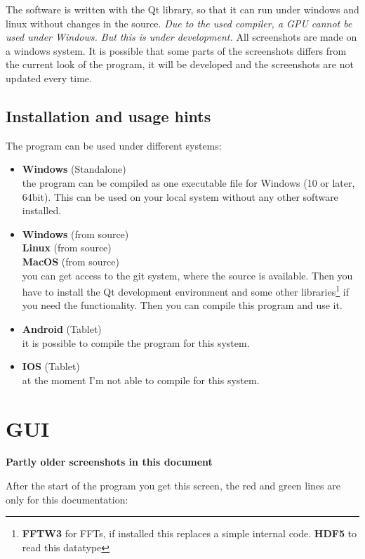 \documentclass[11pt]{article} %
\begin{document}
The software is written with the Qt library, so that it can run under windows and linux without changes in the source. {\it Due to the used compiler, a GPU cannot be used under Windows. But this is under development.} All screenshots are made on a windows system. It is possible that some parts of the screenshots differs from the current look of the program, it will be developed and the screenshots are not updated every time.

\subsection{Installation and usage hints}

The program can be used under different systems:
\begin{itemize}\itemsep0pt
\item {\bf Windows} (Standalone) \\
	the program can be compiled as one executable file for Windows (10 or later, 64bit). This can be used on your local system without any other software installed.
\item {\bf Windows} (from source) \\
	{\bf Linux} (from source) \\
	{\bf MacOS} (from source) \\
	you can get access to the git system, where the source is available. Then you have to install the Qt development environment and some other libraries\footnote{{\bf FFTW3} for FFTs, if installed this replaces a simple internal code. {\bf HDF5} to read this datatype} if you need the functionality. Then you can compile this program and use it.
\item {\bf Android} (Tablet) \\
	it is possible to compile the program for this system.
\item {\bf IOS} (Tablet) \\
	at the moment I'm not able to compile for this system.
\end{itemize}

\clearpage
\section{GUI}

\centerline{\bf Partly older screenshots in this document}
\centerline{ }

After the start of the program you get this screen, the red and green lines are only for this documentation:
\end{document}
